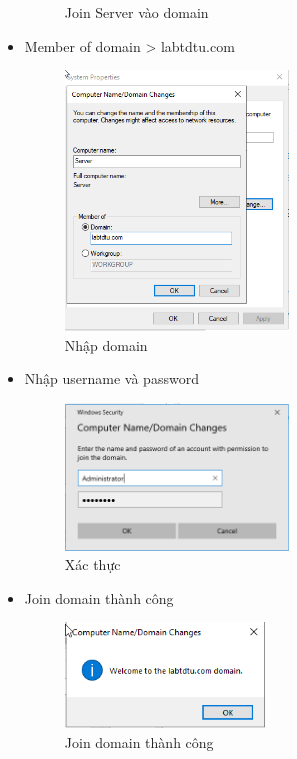 \documentclass[13pt]{report}
\begin{document}
\begin{itemize}
\begin{figure}[htp]
			\caption{Join Server vào domain}
		\end{figure}
		\newpage
		\item Member of domain > labtdtu.com
		\begin{figure}[htp]
			\centering
			\includegraphics[width=0.56\textwidth]{image/Gui/FIT-WEB/4.png}
			\caption{Nhập domain}
		\end{figure}
		\item Nhập username và password
		\begin{figure}[htp]
			\centering
			\includegraphics[width=0.56\textwidth]{image/Gui/FIT-WEB/5.png}
			\caption{Xác thực}
		\end{figure}
		\newpage
		\item Join domain thành công
		\begin{figure}[htp]
			\centering
			\includegraphics[width=0.5\textwidth]{image/Gui/FIT-WEB/6.png}
			\caption{Join domain thành công}
		\end{figure}
	\end{itemize}
\end{document}
